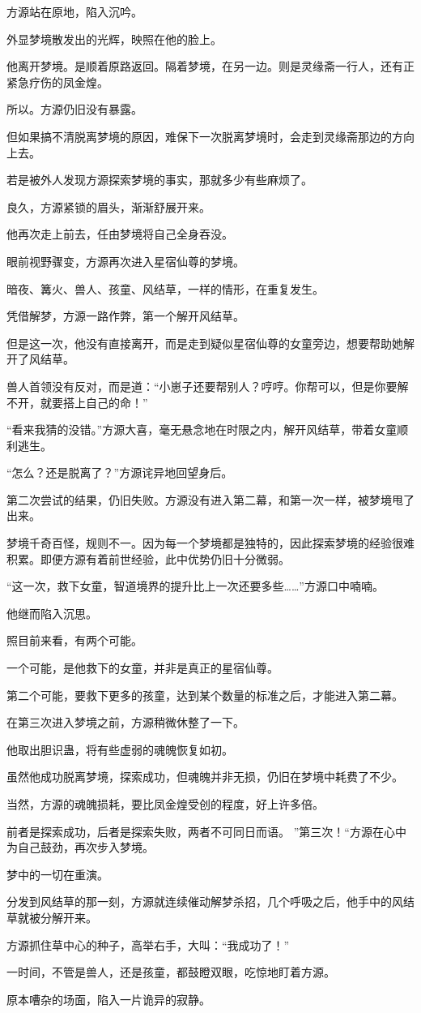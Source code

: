 \begin{this_body}
方源站在原地，陷入沉吟。

外显梦境散发出的光辉，映照在他的脸上。

他离开梦境。是顺着原路返回。隔着梦境，在另一边。则是灵缘斋一行人，还有正紧急疗伤的凤金煌。

所以。方源仍旧没有暴露。

但如果搞不清脱离梦境的原因，难保下一次脱离梦境时，会走到灵缘斋那边的方向上去。

若是被外人发现方源探索梦境的事实，那就多少有些麻烦了。

良久，方源紧锁的眉头，渐渐舒展开来。

他再次走上前去，任由梦境将自己全身吞没。

眼前视野骤变，方源再次进入星宿仙尊的梦境。

暗夜、篝火、兽人、孩童、风结草，一样的情形，在重复发生。

凭借解梦，方源一路作弊，第一个解开风结草。

但是这一次，他没有直接离开，而是走到疑似星宿仙尊的女童旁边，想要帮助她解开了风结草。

兽人首领没有反对，而是道：“小崽子还要帮别人？哼哼。你帮可以，但是你要解不开，就要搭上自己的命！”

“看来我猜的没错。”方源大喜，毫无悬念地在时限之内，解开风结草，带着女童顺利逃生。

“怎么？还是脱离了？”方源诧异地回望身后。

第二次尝试的结果，仍旧失败。方源没有进入第二幕，和第一次一样，被梦境甩了出来。

梦境千奇百怪，规则不一。因为每一个梦境都是独特的，因此探索梦境的经验很难积累。即便方源有着前世经验，此中优势仍旧十分微弱。

“这一次，救下女童，智道境界的提升比上一次还要多些……”方源口中喃喃。

他继而陷入沉思。

照目前来看，有两个可能。

一个可能，是他救下的女童，并非是真正的星宿仙尊。

第二个可能，要救下更多的孩童，达到某个数量的标准之后，才能进入第二幕。

在第三次进入梦境之前，方源稍微休整了一下。

他取出胆识蛊，将有些虚弱的魂魄恢复如初。

虽然他成功脱离梦境，探索成功，但魂魄并非无损，仍旧在梦境中耗费了不少。

当然，方源的魂魄损耗，要比凤金煌受创的程度，好上许多倍。

前者是探索成功，后者是探索失败，两者不可同日而语。 ”第三次！“方源在心中为自己鼓劲，再次步入梦境。

梦中的一切在重演。

分发到风结草的那一刻，方源就连续催动解梦杀招，几个呼吸之后，他手中的风结草就被分解开来。

方源抓住草中心的种子，高举右手，大叫：“我成功了！”

一时间，不管是兽人，还是孩童，都鼓瞪双眼，吃惊地盯着方源。

原本嘈杂的场面，陷入一片诡异的寂静。

\end{this_body}

